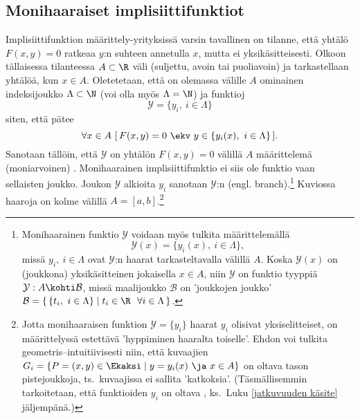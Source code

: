 \subsection{Monihaaraiset implisiittifunktiot}

Implisiittifunktion määrittely-yrityksissä varsin tavallinen on tilanne, että yhtälö $F(x,y)=0$
ratkeaa $y$:n suhteen annetulla $x$, mutta ei yksikäsitteisesti. Olkoon tällaisessa tilanteessa
$A\subset\R$ väli (suljettu, avoin tai puoliavoin) ja tarkastellaan yhtälöä, kun $x \in A$.
Oletetetaan, että on olemassa välille $A$ ominainen indeksijoukko $\Lambda\subset\N$ 
(voi olla myös $\Lambda=\N$) ja funktioj
\[
\mathcal{Y}=\{y_i, \ i \in \Lambda \}
\]
siten, että pätee
\[
\forall x \in A\ [\,F(x,y)=0\ \ekv\ y\in\{y_i(x),\ i\in\Lambda\}\,].
\]
Sanotaan tällöin, että $\mathcal{Y}$ on yhtälön $F(x,y)=0$ välillä $A$ määrittelemä 
 (moniarvoinen) . Monihaarainen implisiittifunktio
ei siis ole funktio vaan sellaisten joukko. Joukon $\mathcal{Y}$ alkioita $y_i$ sanotaan
%
$\mathcal{Y}$:n  (engl. branch).\footnote[2]{Monihaarainen funktio $\mathcal{Y}$
voidaan myös tulkita  määrittelemällä
\[ 
\mathcal{Y}(x) = \{y_i(x),\ i \in \Lambda\},
\]
missä $y_i,\ i \in \Lambda$ ovat $\mathcal{Y}$:n haarat tarkasteltavalla välillä $A$. Koska
$\mathcal{Y}(x)$ on (joukkona) yksikäsitteinen jokaisella $x \in A$, niin $\mathcal{Y}$ on
funktio tyyppiä $\mathcal{Y}: A \kohti \mathcal{B}$, missä maalijoukko $\mathcal{B}$ on
'joukkojen joukko' 
$\mathcal{B} = \{\,\{t_i, \ i \in \Lambda\} \mid t_i \in \R\ \ \forall i \in \Lambda\,\}$.
} 
Kuviossa haaroja on kolme välillä $A=[a,b]$.\footnote[3]{Jotta monihaaraisen funktion 
$\mathcal{Y}=\{y_i\}$ haarat $y_i$ olisivat yksiselitteiset, on määrittelyssä estettävä 
'hyppiminen haaralta toiselle'. Ehdon voi tulkita geometris--intuitiivisesti niin, että
kuvaajien $G_i=\{P=(x,y)\in\Ekaksi \mid y=y_i(x)\ \ja\ x \in A\}$ on oltava 
tason pistejoukkoja, ts.\ kuvaajissa ei sallita 'katkoksia'. (Täsmällisemmin tarkoitetaan,
että funktioiden $y_i$ on oltava , ks.\ Luku \ref{jatkuvuuden käsite}
jäljempänä.)}

